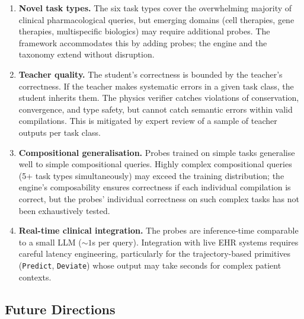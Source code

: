 \documentclass[11pt,twocolumn,a4paper]{article}
\theoremstyle{definition}
\theoremstyle{remark}
\begin{document}
\begin{enumerate}[nosep,leftmargin=*]
\item \textbf{Novel task types.} The six task types cover the overwhelming majority of clinical pharmacological queries, but emerging domains (cell therapies, gene therapies, multispecific biologics) may require additional probes. The framework accommodates this by adding probes; the engine and the taxonomy extend without disruption.

\item \textbf{Teacher quality.} The student's correctness is bounded by the teacher's correctness. If the teacher makes systematic errors in a given task class, the student inherits them. The physics verifier catches violations of conservation, convergence, and type safety, but cannot catch semantic errors within valid compilations. This is mitigated by expert review of a sample of teacher outputs per task class.

\item \textbf{Compositional generalisation.} Probes trained on simple tasks generalise well to simple compositional queries. Highly complex compositional queries (5+ task types simultaneously) may exceed the training distribution; the engine's composability ensures correctness if each individual compilation is correct, but the probes' individual correctness on such complex tasks has not been exhaustively tested.

\item \textbf{Real-time clinical integration.} The probes are inference-time comparable to a small LLM ($\sim\!1$s per query). Integration with live EHR systems requires careful latency engineering, particularly for the trajectory-based primitives (\texttt{Predict}, \texttt{Deviate}) whose output may take seconds for complex patient contexts.
\end{enumerate}

\subsection{Future Directions}
\end{document}
